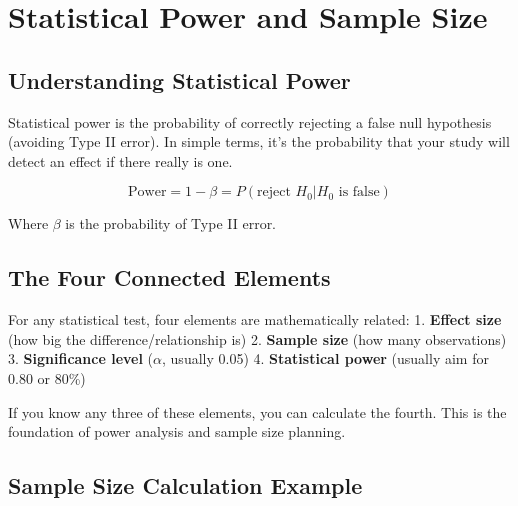 \documentclass[
  11pt,
  letterpaper,
  oneside]{book}
\begin{document}
\section{Statistical Power and Sample
Size}\label{statistical-power-and-sample-size}

\subsection{Understanding Statistical
Power}\label{understanding-statistical-power}

Statistical power is the probability of correctly rejecting a false null
hypothesis (avoiding Type II error). In simple terms, it's the
probability that your study will detect an effect if there really is
one.

\[\text{Power} = 1 - \beta = P(\text{reject } H_0 | H_0 \text{ is false})\]

Where \(\beta\) is the probability of Type II error.

\subsection{The Four Connected
Elements}\label{the-four-connected-elements}

For any statistical test, four elements are mathematically related: 1.
\textbf{Effect size} (how big the difference/relationship is) 2.
\textbf{Sample size} (how many observations) 3. \textbf{Significance
level} (\(\alpha\), usually 0.05) 4. \textbf{Statistical power} (usually
aim for 0.80 or 80\%)

\begin{tcolorbox}[enhanced jigsaw, toprule=.15mm, left=2mm, opacitybacktitle=0.6, colframe=quarto-callout-tip-color-frame, leftrule=.75mm, titlerule=0mm, coltitle=black, colbacktitle=quarto-callout-tip-color!10!white, toptitle=1mm, title=\textcolor{quarto-callout-tip-color}{\faLightbulb}\hspace{0.5em}{Power Analysis Rule}, bottomtitle=1mm, arc=.35mm, rightrule=.15mm, bottomrule=.15mm, breakable, opacityback=0, colback=white]

If you know any three of these elements, you can calculate the fourth.
This is the foundation of power analysis and sample size planning.

\end{tcolorbox}

\subsection{Sample Size Calculation
Example}\label{sample-size-calculation-example}
\end{document}

